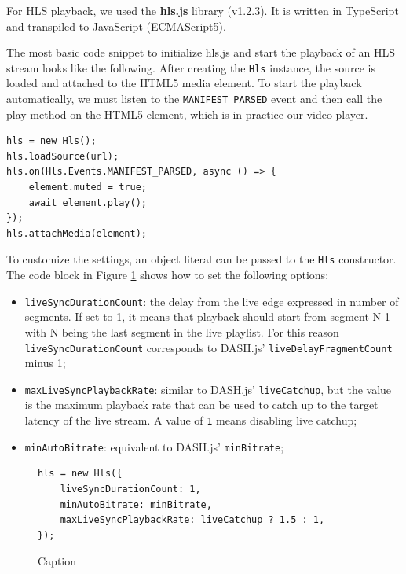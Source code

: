 For HLS playback, we used the \textbf{hls.js} library (v1.2.3). It is written in TypeScript and transpiled to JavaScript (ECMAScript5).

The most basic code snippet to initialize hls.js and start the playback of an HLS stream looks like the following. After creating the \texttt{Hls} instance, the source is loaded and attached to the HTML5 media element. To start the playback automatically, we must listen to the \texttt{MANIFEST\_PARSED} event and then call the play method on the HTML5 element, which is in practice our video player.

\begin{verbatim}
hls = new Hls();
hls.loadSource(url);
hls.on(Hls.Events.MANIFEST_PARSED, async () => {
    element.muted = true;
    await element.play();
});
hls.attachMedia(element);
\end{verbatim}

To customize the settings, an object literal can be passed to the \texttt{Hls} constructor. The code block in Figure \ref{fig:hlsjs_settings} shows how to set the following options:

\begin{itemize}
    \item \texttt{liveSyncDurationCount}: the delay from the live edge expressed in number of segments. If set to 1, it means that playback should start from segment N-1 with N being the last segment in the live playlist. For this reason \texttt{liveSyncDurationCount} corresponds to DASH.js' \texttt{liveDelayFragmentCount} minus 1;
    \item \texttt{maxLiveSyncPlaybackRate}: similar to DASH.js' \texttt{liveCatchup}, but the value is the maximum playback rate that can be used to catch up to the target latency of the live stream. A value of \texttt{1} means disabling live catchup;
    \item \texttt{minAutoBitrate}: equivalent to DASH.js' \texttt{minBitrate};
\end{itemize}

\begin{figure}[h]
    \centering
    \begin{verbatim}
hls = new Hls({
    liveSyncDurationCount: 1,
    minAutoBitrate: minBitrate,
    maxLiveSyncPlaybackRate: liveCatchup ? 1.5 : 1,
});
    \end{verbatim}
    \caption{Caption}
    \label{fig:hlsjs_settings}
\end{figure}

